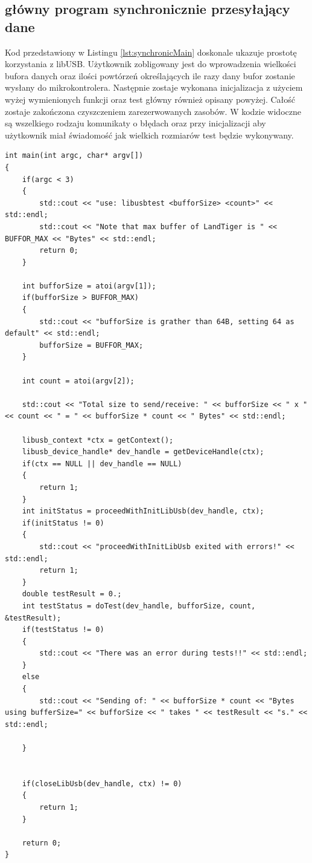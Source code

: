 \documentclass{BscUS}
\begin{document}
\subsection{główny program synchronicznie przesyłający dane}
Kod przedstawiony w Listingu \ref{lst:synchronicMain} doskonale ukazuje prostotę korzystania z libUSB. Użytkownik zobligowany jest do wprowadzenia wielkości bufora danych oraz ilości powtórzeń określających ile razy dany bufor zostanie wysłany do mikrokontrolera. Następnie zostaje wykonana inicjalizacja z użyciem wyżej wymienionych funkcji oraz test główny również opisany powyżej. Całość zostaje zakończona czyszczeniem zarezerwowanych zasobów. W kodzie widoczne są wszelkiego rodzaju komunikaty o błędach oraz przy inicjalizacji aby użytkownik miał świadomość jak wielkich rozmiarów test będzie wykonywany.
\begin{lstlisting}[caption={Funkcja main()},label={lst:synchronicMain}]
int main(int argc, char* argv[])
{
	if(argc < 3) 
	{
		std::cout << "use: libusbtest <bufforSize> <count>" << std::endl;
		std::cout << "Note that max buffer of LandTiger is " << BUFFOR_MAX << "Bytes" << std::endl;
		return 0; 
	}
	
	int bufforSize = atoi(argv[1]);
	if(bufforSize > BUFFOR_MAX) 
	{
		std::cout << "bufforSize is grather than 64B, setting 64 as default" << std::endl;
		bufforSize = BUFFOR_MAX;
	}

	int count = atoi(argv[2]);

	std::cout << "Total size to send/receive: " << bufforSize << " x " << count << " = " << bufforSize * count << " Bytes" << std::endl;
	
	libusb_context *ctx = getContext(); 
	libusb_device_handle* dev_handle = getDeviceHandle(ctx);
	if(ctx == NULL || dev_handle == NULL)
	{
		return 1;
	}
	int initStatus = proceedWithInitLibUsb(dev_handle, ctx);
	if(initStatus != 0) 
	{
		std::cout << "proceedWithInitLibUsb exited with errors!" << std::endl;
		return 1;
	}
	double testResult = 0.;
	int testStatus = doTest(dev_handle, bufforSize, count, &testResult);
	if(testStatus != 0) 
	{
		std::cout << "There was an error during tests!!" << std::endl;
	}
	else
	{
		std::cout << "Sending of: " << bufforSize * count << "Bytes using bufferSize=" << bufforSize << " takes " << testResult << "s." << std::endl;

	}


	if(closeLibUsb(dev_handle, ctx) != 0)
	{
		return 1;
	}

	return 0;
}
\end{lstlisting}
\fi
\end{document}
